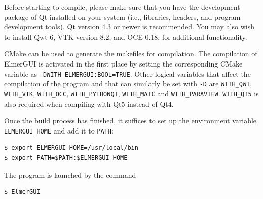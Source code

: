 Before starting to compile, please make sure that you have the development package of Qt
installed on your system (i.e., libraries, headers, and program development tools). Qt version 4.3
or newer is recommended. You may also wish to install Qwt 6,
VTK version 8.2,
and OCE 0.18, for additional functionality. 

CMake can be used to generate the makefiles for compilation. The compilation of ElmerGUI is activated 
in the first place by setting the corresponding CMake variable as {\tt -DWITH\_ELMERGUI:BOOL=TRUE}. 
Other logical variables that affect the compilation of the program and that can similarly be set 
with {\tt -D} are {\tt WITH\_QWT}, {\tt WITH\_VTK},
{\tt WITH\_OCC}, {\tt WITH\_PYTHONQT},
{\tt WITH\_MATC} and {\tt WITH\_PARAVIEW}. {\tt WITH\_QT5} is also required when compiling with Qt5 instead of Qt4.



Once the build process has finished, it suffices to set up the environment variable {\tt ELMERGUI\_HOME}
and add it to {\tt PATH}:
\begin{verbatim}
$ export ELMERGUI_HOME=/usr/local/bin
$ export PATH=$PATH:$ELMERGUI_HOME
\end{verbatim}
The program is launched by the command
\begin{verbatim}
$ ElmerGUI
\end{verbatim}




